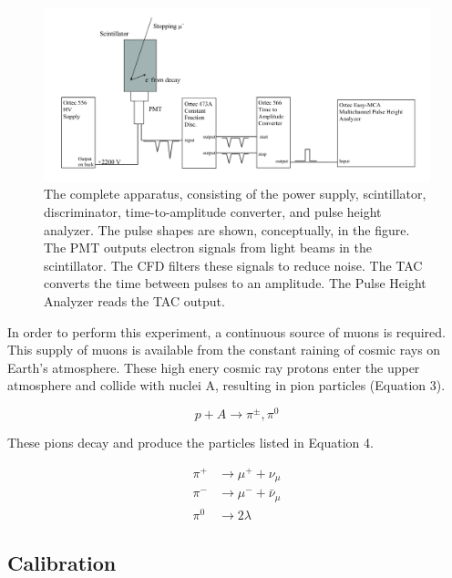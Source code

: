 \documentclass[%
 aip,
 amsmath,amssymb,
 reprint,%
floatfix,
]{revtex4-1}
\begin{document}
\begin{figure}[H]
	\centering
	\includegraphics[scale=0.25]{schematic.png}
	\caption{The complete apparatus, consisting of the power supply, scintillator, discriminator, time-to-amplitude converter, and pulse height analyzer. The pulse shapes are shown, conceptually, in the figure. The PMT outputs electron signals from light beams in the scintillator. The CFD filters these signals to reduce noise. The TAC converts the time between pulses to an amplitude. The Pulse Height Analyzer reads the TAC output.\cite{oxymanual}}
\end{figure}

In order to perform this experiment, a continuous source of muons is required. This supply of muons is available from the constant raining of cosmic rays on Earth's atmosphere. These high enery cosmic ray protons enter the upper atmosphere and collide with nuclei A, resulting in pion particles (Equation 3).

\begin{equation}
	p + A \rightarrow \pi^{\pm}, \pi^0
\end{equation}

These pions decay and produce the particles listed in Equation 4.

\begin{equation}
	\begin{aligned}
		\pi^+ & \rightarrow \mu^+ + \nu_{\mu} \\
		\pi^- & \rightarrow \mu^- + \bar{\nu}_{\mu} \\
		\pi^0 & \rightarrow 2\lambda
	\end{aligned}
\end{equation}



\subsection{Calibration}
\end{document}
